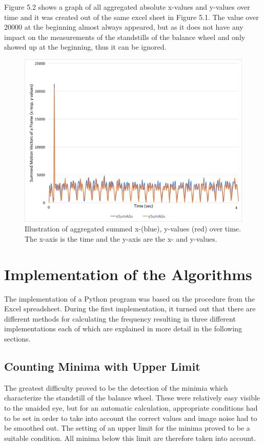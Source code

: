 \documentclass[12pt, a4paper]{report}
\begin{document}
    Figure 5.2 shows a graph of all aggregated absolute x-values and y-values over time and it was created out of the same excel sheet in Figure 5.1. The value over 20000 at the beginning almost always appeared, but as it does not have any impact on the measurements of the standstills of the balance wheel and only showed up at the beginning, thus it can be ignored.

    \noindent
    \begin{figure}[H]
    \centering
    \includegraphics[scale=0.45]{Images/excel_sheet_graph.png}
    
    \caption{Illustration of aggregated summed x-(blue), y-values (red) over time. The x-axis is the time and the y-axis are the x- and y-values.}
    \end{figure}
    
       \section{Implementation of the Algorithms}
 The implementation of a Python program was based on the procedure from the Excel spreadsheet. During the first implementation, it turned out that there are different methods for calculating the frequency resulting in three different implementations each of which are explained in more detail in the following sections.
    \subsection{Counting Minima with Upper Limit} 
    
    The greatest difficulty proved to be the detection of the minimia which characterize the standstill of the balance wheel. These were relatively easy visible to the unaided eye, but for an automatic calculation, appropriate conditions had to be set in order to take into account the correct values and image noise had to be smoothed out. The setting of an upper limit for the minima proved to be a suitable condition. All minima below this limit are therefore taken into account. 
    
\end{document}
